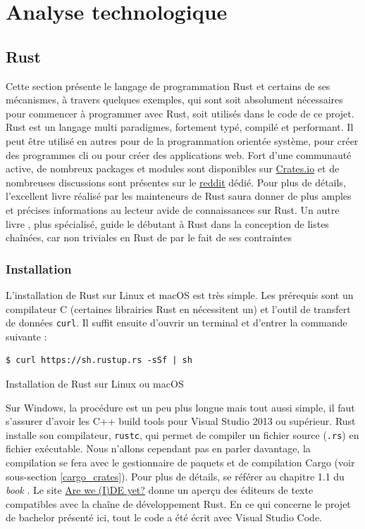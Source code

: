 \documentclass[a4paper, 12pt]{article}
\newenvironment{code}{\captionsetup{type=listing}}{}
\begin{document}
\section{Analyse technologique} %
\subsection{Rust}
Cette section présente le langage de programmation Rust et certains de ses mécanismes, à 
travers quelques exemples, qui sont soit absolument nécessaires pour commencer à programmer avec 
Rust, soit utilisés dans le code de ce projet. Rust est un langage multi paradigmes, fortement typé, 
compilé et performant. Il peut être utilisé en autres pour de la programmation orientée système, 
pour créer des programmes \acrshort{cli} ou pour créer des applications web. Fort d'une communauté active, de 
nombreux packages et modules sont disponibles sur \href{https://crates.io}{Crates.io} \cite{ref33} 
et de nombreuses discussions sont présentes sur le \href{https://www.reddit.com/r/rust/}{reddit} 
\cite{ref34} dédié. Pour plus de détails, l'excellent livre \cite{ref0} réalisé par les mainteneurs 
de Rust saura donner de plus amples et précises informations au lecteur avide de connaissances sur 
Rust. Un autre livre \cite{ref2}, plus spécialisé, guide le débutant à Rust dans la conception de 
listes chaînées, car non triviales en Rust de par le fait de ses contraintes

\subsubsection{Installation}
L'installation de Rust sur Linux et macOS est très simple. Les prérequis sont un 
compilateur C (certaines librairies Rust en nécessitent un) et l'outil de transfert de données 
\texttt{curl}. Il suffit ensuite d'ouvrir un terminal et d'entrer la commande suivante :
\bigbreak
\begin{code}
    \begin{verbatim}
$ curl https://sh.rustup.rs -sSf | sh
    \end{verbatim}
    \caption{Installation de Rust sur Linux ou macOS}
\end{code}
\bigbreak
Sur Windows, la procédure est un peu plus longue mais tout aussi simple, il faut s'assurer d'avoir 
les C++ build tools pour Visual Studio 2013 ou supérieur. Rust installe son compilateur, 
\texttt{rustc}, qui permet de compiler un fichier source (\texttt{.rs}) en 
fichier exécutable. Nous n'allons cependant pas en parler davantage, la compilation se fera avec 
le gestionnaire de paquets et de compilation Cargo (voir sous-section \ref{cargo_crates}).
Pour plus de détails, se référer au chapitre 1.1 du \textit{book} \cite{ref0}.
Le site \href{https://areweideyet.com/}{Are we (I)DE yet?} \cite{ref1} donne un aperçu des éditeurs 
de texte compatibles avec la chaîne de développement Rust. En ce qui concerne le projet de bachelor 
présenté ici, tout le code a été écrit avec Visual Studio Code.
\end{document}
